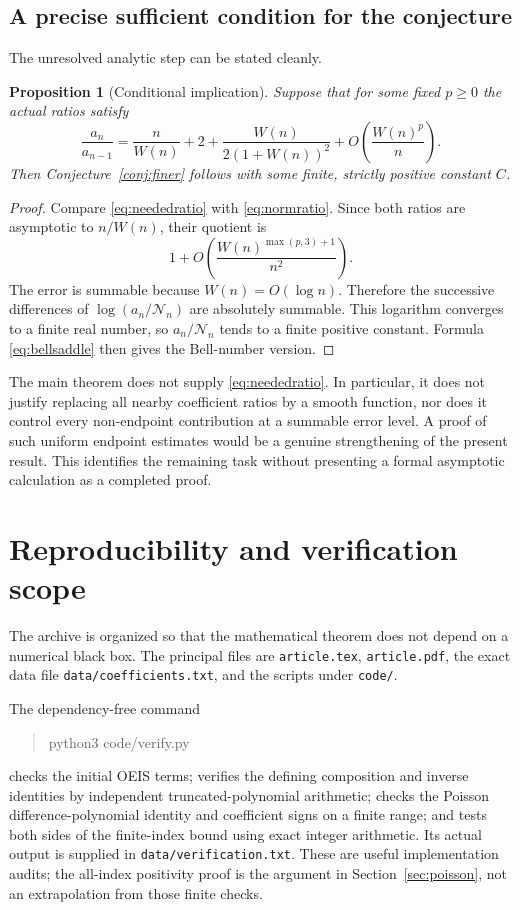 \documentclass[11pt]{article}
\numberwithin{equation}{section}
\newtheorem{proposition}[theorem]{Proposition}
\theoremstyle{remark}
\begin{document}
\subsection{A precise sufficient condition for the conjecture}

The unresolved analytic step can be stated cleanly.
\begin{proposition}[Conditional implication]\label{prop:conditional}
Suppose that for some fixed $p\ge0$ the actual ratios satisfy
\begin{equation}\label{eq:neededratio}
 \frac{a_n}{a_{n-1}}
 =\frac n{W(n)}+2+
     \frac{W(n)}{2(1+W(n))^2}
       +O\!\left(\frac{W(n)^p}{n}\right).
\end{equation}
Then Conjecture~\ref{conj:finer} follows with some finite, strictly
positive constant $C$.
\end{proposition}
\begin{proof}
Compare \eqref{eq:neededratio} with \eqref{eq:normratio}. Since both
ratios are asymptotic to $n/W(n)$, their quotient is
\[
 1+O\!\left(\frac{W(n)^{\max(p,3)+1}}{n^2}\right).
\]
The error is summable because $W(n)=O(\log n)$. Therefore the successive
differences of $\log(a_n/\mathcal N_n)$ are absolutely summable. This
logarithm converges to a finite real number, so $a_n/\mathcal N_n$ tends
to a finite positive constant. Formula \eqref{eq:bellsaddle} then gives
the Bell-number version.
\end{proof}

The main theorem does not supply \eqref{eq:neededratio}. In particular,
it does not justify replacing all nearby coefficient ratios by a smooth
function, nor does it control every non-endpoint contribution at a
summable error level. A proof of such uniform endpoint estimates would
be a genuine strengthening of the present result. This identifies the
remaining task without presenting a formal asymptotic calculation as a
completed proof.

\section{Reproducibility and verification scope}

The archive is organized so that the mathematical theorem does not
depend on a numerical black box. The principal files are
\texttt{article.tex}, \texttt{article.pdf}, the exact data file
\texttt{data/coefficients.txt}, and the scripts under \texttt{code/}.

The dependency-free command
\begin{quote}\ttfamily
 python3 code/verify.py
\end{quote}
checks the initial OEIS terms; verifies the defining composition and
inverse identities by independent truncated-polynomial arithmetic;
checks the Poisson difference-polynomial identity and coefficient signs
on a finite range; and tests both sides of the finite-index bound using
exact integer arithmetic. Its actual output is supplied in
\texttt{data/verification.txt}. These are useful implementation audits;
the all-index positivity proof is the argument in
Section~\ref{sec:poisson}, not an extrapolation from those finite checks.
\end{document}
